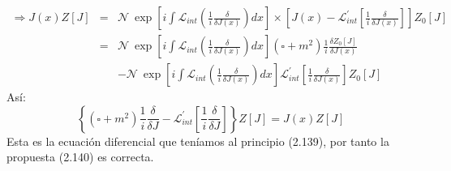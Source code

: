 \begin{eqnarray}
\nonumber \Rightarrow J(x)Z[J]&=&\mathcal{N}\ \exp\left[i\int\mathcal{L}_{int}\left(\frac{1}{i}\frac{\delta}{\delta J(x)}\right)dx\right]\times\left[J(x)-\mathcal{L}_{int}^{\prime}\left[\frac{1}{i}\frac{\delta}{\delta J(x)}\right]\right]Z_{0}[J]\\
\nonumber &=&\mathcal{N}\ \exp\left[i\int\mathcal{L}_{int}\left(\frac{1}{i}\frac{\delta}{\delta J(x)}\right)dx\right](\square+m^{2})\frac{1}{i}\frac{\delta Z_{0}[J]}{\delta J(x)}\\
&&-\mathcal{N}\ \exp\left[i\int\mathcal{L}_{int}\left(\frac{1}{i}\frac{\delta}{\delta J(x)}\right)dx\right]\mathcal{L}_{int}^{\prime}\left[\frac{1}{i}\frac{\delta}{\delta J(x)}\right]Z_{0}[J]
\end{eqnarray}
Así:
\begin{equation}
\left\{ (\square+m^{2})\frac{1}{i}\frac{\delta}{\delta J}-\mathcal{L}_{int}^{\prime}\left[\frac{1}{i}\frac{\delta}{\delta J}\right]\right\} Z[J]=J(x)Z[J]
\end{equation}
Esta es la ecuación diferencial que teníamos al principio (2.139), por tanto la propuesta (2.140) es correcta.
\newpage


